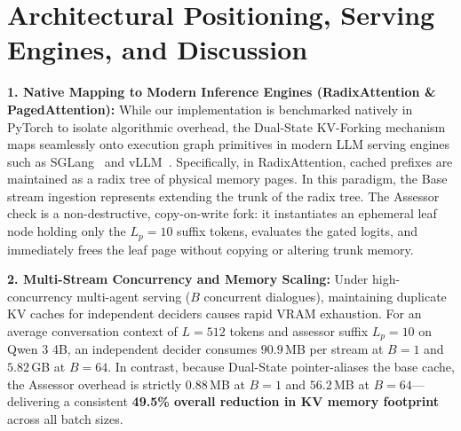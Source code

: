 \documentclass{article}
\begin{document}
\begin{table}[h]
\centering
\caption{\textbf{Comparison: Auxiliary Lightweight Probing vs. Dual-State Assessor (Qwen 3 4B).}}
\label{tab:probe_comparison}
\vspace{0.2cm}
\end{table}

\section{Architectural Positioning, Serving Engines, and Discussion}

\textbf{1. Native Mapping to Modern Inference Engines (RadixAttention \& PagedAttention):}
While our implementation is benchmarked natively in PyTorch to isolate algorithmic overhead, the Dual-State KV-Forking mechanism maps seamlessly onto execution graph primitives in modern LLM serving engines such as SGLang~\citep{zheng2023sglang} and vLLM~\citep{kwon2023vllm}. Specifically, in RadixAttention, cached prefixes are maintained as a radix tree of physical memory pages. In this paradigm, the Base stream ingestion represents extending the trunk of the radix tree. The Assessor check is a non-destructive, copy-on-write fork: it instantiates an ephemeral leaf node holding only the $L_p = 10$ suffix tokens, evaluates the gated logits, and immediately frees the leaf page without copying or altering trunk memory.

\textbf{2. Multi-Stream Concurrency and Memory Scaling:}
Under high-concurrency multi-agent serving ($B$ concurrent dialogues), maintaining duplicate KV caches for independent deciders causes rapid VRAM exhaustion. For an average conversation context of $L=512$ tokens and assessor suffix $L_p=10$ on Qwen 3 4B, an independent decider consumes $90.9$\,MB per stream at $B=1$ and $5.82$\,GB at $B=64$. In contrast, because Dual-State pointer-aliases the base cache, the Assessor overhead is strictly $0.88$\,MB at $B=1$ and $56.2$\,MB at $B=64$---delivering a consistent \textbf{49.5\% overall reduction in KV memory footprint} across all batch sizes.
\end{document}
